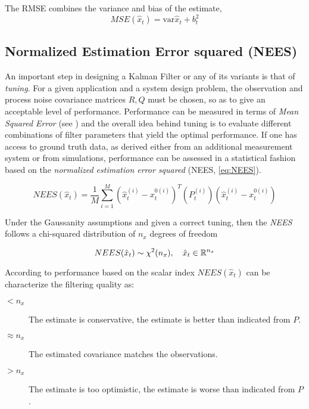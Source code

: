 The RMSE combines the variance and bias of the estimate,
\begin{equation}\label{key}
MSE(\hat{x}_t)  = \text{var} \hat{x}_t + b_t^2
\end{equation}
\subsection{Normalized Estimation Error squared (NEES)}
An important step in designing a Kalman Filter or any of its variants is that of \emph{tuning}. For a given application and a system design problem, the observation and process noise covariance matrices $R,Q$ must be chosen, so as to give an acceptable level of performance. Performance can be measured in terms of \emph{Mean Squared Error} (see ) and the overall idea behind tuning is to evaluate different combinations of filter parameters that yield the optimal performance. If one has access to ground truth data, as derived either from an additional measurement system or from simulations, performance can be assessed in a statistical fashion based on the \emph{normalized estimation error squared} (NEES, \cref{eq:NEES}). 

\begin{equation}\label{eq:NEES}
NEES(\hat{x}_t) = \frac{1}{M} \sum_{i=1}^{M} ({\hat{x}_t^{(i)} - x_t^{0(i)}})^T (P^{(i)}_t)({\hat{x}_t^{(i)} - x_t^{0(i)}}) 
\end{equation}

Under the Gaussanity assumptions and given a correct tuning, then the \emph{NEES} follows a chi-squared distribution of $n_x$  degrees of freedom

\begin{equation}\label{key}
NEES(\hat{x}_t) \sim \chi^2(n_x), \quad \hat{x}_t \in {\mathbb{R}}^{n_x}
\end{equation}

According to \cite{TargetTracking} performance based on the scalar index $NEES(\hat{x}_t)$ can be characterize the filtering quality as:

\begin{description}
	\item[$< n_x$] The estimate is conservative, \ie the estimate is better than indicated from $P$.
	\item[$ \approx n_x $] The estimated covariance matches the observations.
	\item[$> n_x$] The estimate is too optimistic, \ie the estimate is worse than indicated from $P$.
\end{description}
